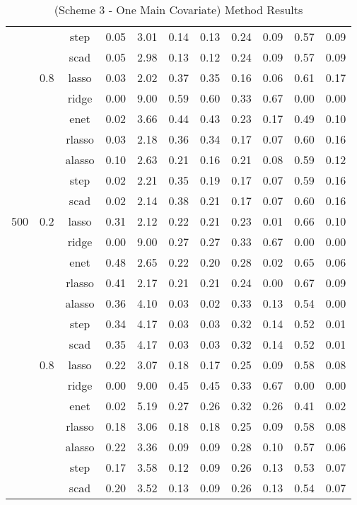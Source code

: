\begin{table}[H]
{\begin{tabular}{c c c|c|c|c c|c c c c}
        & &step &0.05 &3.01 &0.14 &0.13 &0.24 &0.09 &0.57 &0.09\\
        & &scad &0.05 &2.98 &0.13 &0.12 &0.24 &0.09 &0.57 &0.09\\
        \cline{2-11}
        &0.8 &lasso &0.03 &2.02 &0.37 &0.35 &0.16 &0.06 &0.61 &0.17\\
        & &ridge &0.00 &9.00 &0.59 &0.60 &0.33 &0.67 &0.00&0.00\\
        & &enet &0.02 &3.66 &0.44 &0.43 &0.23 &0.17 &0.49 &0.10\\
        & &rlasso &0.03 &2.18 &0.36 &0.34 &0.17 &0.07 &0.60 &0.16\\
        & &alasso &0.10&2.63 &0.21 &0.16 &0.21 &0.08 &0.59 &0.12\\
        & &step &0.02 &2.21 &0.35 &0.19 &0.17 &0.07 &0.59 &0.16\\
        & &scad &0.02 &2.14 &0.38 &0.21 &0.17 &0.07 &0.60 &0.16\\
        \hline
        500 &0.2 &lasso &0.31 &2.12 &0.22 &0.21 &0.23 &0.01 &0.66 &0.10\\
        & &ridge &0.00 &9.00 &0.27 &0.27 &0.33 &0.67 &0.00&0.00\\
        & &enet &0.48 &2.65 &0.22 &0.20 &0.28 &0.02 &0.65 &0.06\\
        & &rlasso &0.41 &2.17 &0.21 &0.21 &0.24 &0.00&0.67 &0.09\\
        & &alasso &0.36 &4.10 &0.03 &0.02 &0.33 &0.13 &0.54 &0.00\\
        & &step &0.34 &4.17 &0.03 &0.03 &0.32 &0.14 &0.52 &0.01\\
        & &scad &0.35 &4.17 &0.03 &0.03 &0.32 &0.14 &0.52 &0.01\\
        \cline{2-11}
        &0.8 &lasso &0.22 &3.07 &0.18 &0.17 &0.25 &0.09 &0.58 &0.08\\
        & &ridge &0.00 &9.00 &0.45 &0.45 &0.33 &0.67 &0.00&0.00\\
        & &enet &0.02 &5.19 &0.27 &0.26 &0.32 &0.26 &0.41 &0.02\\
        & &rlasso &0.18 &3.06 &0.18 &0.18 &0.25 &0.09 &0.58 &0.08\\
        & &alasso &0.22 &3.36 &0.09 &0.09 &0.28 &0.10&0.57 &0.06\\
        & &step &0.17 &3.58 &0.12 &0.09 &0.26 &0.13 &0.53 &0.07\\
        & &scad &0.20 &3.52 &0.13 &0.09 &0.26 &0.13 &0.54 &0.07\\
        \hline
    \end{tabular}
    }
    \caption{(Scheme 3 - One Main Covariate) Method Results}
    \label{tbl:scheme-3-results}
\end{table}



